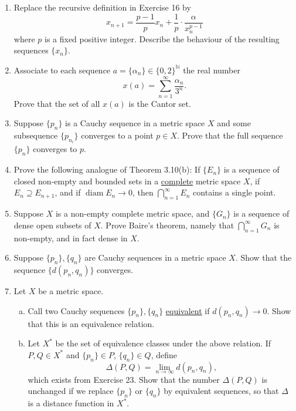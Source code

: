 \documentclass{scrbook}
\newcommand{\N}{\mathbb{N}}
\renewcommand{\to}{\rightarrow}
\renewcommand{\underline}{\ul}
\DeclareMathOperator{\diam}{diam}
\begin{document}
\begin{enumerate}
\item %
Replace the recursive definition in Exercise 16 by
\[
	x_{n+1} = \frac{p-1}{p} x_n + \frac{1}{p} \cdot \frac{\alpha}{x_n^{p-1}}
\]
where $p$ is a fixed positive integer. Describe the behaviour of the resulting sequences $\{x_n\}$. 

\item %
Associate to each sequence $a = \{\alpha_n\} \in \{0, 2\}^{\N}$ the real number
\[
	x(a) = \sum_{n=1}^{\infty} \frac{\alpha_n}{3^n}.
\]
Prove that the set of all $x(a)$ is the Cantor set.

\item %
Suppose $\{p_n\}$ is a Cauchy sequence in a metric space $X$ and some subsequence $\{p_{n_i}\}$ converges to a point $p \in X$. Prove that the full sequence $\{p_n\}$ converges to $p$.

\item %
Prove the following analogue of Theorem 3.10(b): If $\{E_n\}$ is a sequence of closed non-empty and bounded sets in a \underline{complete} metric space $X$, if $E_n \supseteq E_{n+1}$, and if $\diam E_n \to 0$, then $\bigcap_{n=1}^{\infty} E_n$ contains a single point.

\item %
Suppose $X$ is a non-empty complete metric space, and $\{G_n\}$ is a sequence of dense open subsets of $X$. Prove Baire's theorem, namely that $\bigcap_{n=1}^{\infty} G_n$ is non-empty, and in fact dense in $X$.

\item %
Suppose $\{p_n\}, \{q_n\}$ are Cauchy sequences in a metric space $X$. Show that the sequence $\{d(p_n, q_n)\}$ converges.

\item %
Let $X$ be a metric space.
\begin{enumerate}[(a)]
\item Call two Cauchy sequences $\{p_n\}, \{q_n\}$ \underline{equivalent} if $d(p_n, q_n) \to 0$. Show that this is an equivalence relation.

\item Let $X^*$ be the set of equivalence classes under the above relation. If $P, Q \in X^*$ and $\{p_n\} \in P$, $\{q_n\} \in Q$, define
\[
	\Delta(P, Q) = \lim_{n \to \infty} d(p_n, q_n),
\]
which exists from Exercise 23. Show that the number $\Delta(P, Q)$ is unchanged if we replace $\{p_n\}$ or $\{q_n\}$ by equivalent sequences, so that $\Delta$ is a distance function in $X^*$.


\end{enumerate}
\end{enumerate}
\end{document}
